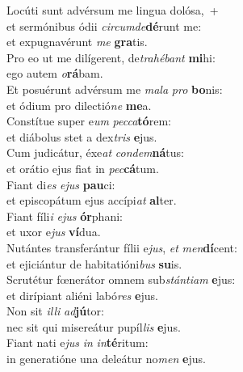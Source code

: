 \evenverse Locúti sunt advérsum me lingua dolósa,~+\\\evenverse  et sermónibus ódii \textit{cir}\textit{cum}\textit{de}\textbf{dé}runt me:~\*\\
\evenverse et expugnavérunt \textit{me} \textbf{gra}tis.\\
\oddverse Pro eo ut me dilígerent, de\textit{tra}\textit{hé}\textit{bant} \textbf{mi}hi:~\*\\
\oddverse ego autem \textit{o}\textbf{rá}bam.\\
\evenverse Et posuérunt advérsum me \textit{ma}\textit{la} \textit{pro} \textbf{bo}nis:~\*\\
\evenverse et ódium pro dilectió\textit{ne} \textbf{me}a.\\
\oddverse Constítue super e\textit{um} \textit{pec}\textit{ca}\textbf{tó}rem:~\*\\
\oddverse et diábolus stet a dex\textit{tris} \textbf{e}jus.\\
\evenverse Cum judicátur, éxe\textit{at} \textit{con}\textit{dem}\textbf{ná}tus:~\*\\
\evenverse et orátio ejus fiat in \textit{pec}\textbf{cá}tum.\\
\oddverse Fiant di\textit{es} \textit{e}\textit{jus} \textbf{pau}ci:~\*\\
\oddverse et episcopátum ejus accípi\textit{at} \textbf{al}ter.\\
\evenverse Fiant fíli\textit{i} \textit{e}\textit{jus} \textbf{ór}phani:~\*\\
\evenverse et uxor e\textit{jus} \textbf{ví}dua.\\
\oddverse Nutántes transferántur fílii e\textit{jus}, \textit{et} \textit{men}\textbf{dí}cent:~\*\\
\oddverse et ejiciántur de habitatióni\textit{bus} \textbf{su}is.\\
\evenverse Scrutétur fœnerátor omnem sub\textit{stán}\textit{ti}\textit{am} \textbf{e}jus:~\*\\
\evenverse et dirípiant aliéni labó\textit{res} \textbf{e}jus.\\
\oddverse Non sit \textit{il}\textit{li} \textit{ad}\textbf{jú}tor:~\*\\
\oddverse nec sit qui misereátur pupíl\textit{lis} \textbf{e}jus.\\
\evenverse Fiant nati e\textit{jus} \textit{in} \textit{in}\textbf{té}ritum:~\*\\
\evenverse in generatióne una deleátur no\textit{men} \textbf{e}jus.\\
